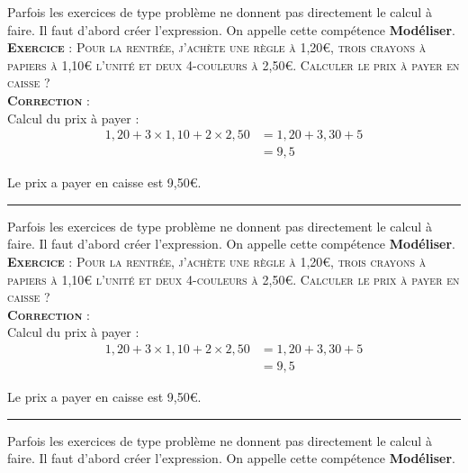 \documentclass[11pt]{article}
\newcommand{\horrule}[1]{\rule{\linewidth}{#1}} %
\begin{document}
Parfois les exercices de type problème ne donnent pas directement le calcul à faire. Il faut d'abord créer l'expression. On appelle cette compétence \textbf{Modéliser}.\\

\textsc{\textbf{Exercice} : Pour la rentrée, j'achète une règle à 1,20€, trois crayons à papiers à 1,10€ l'unité et deux 4-couleurs à 2,50€.} \newline
\textsc{Calculer le prix à payer en caisse ?}\\

\textsc{\textbf{Correction} :}\\

Calcul du prix à payer :
\begin{align*}
1,20 + 3 \times 1,10 + 2 \times 2,50 &= 1,20 + 3,30 + 5 \\
                                     &= 9,5
\end{align*}

Le prix a payer en caisse est 9,50€.

\vspace{0.5cm}\horrule{1px}\vspace{0.5cm}


Parfois les exercices de type problème ne donnent pas directement le calcul à faire. Il faut d'abord créer l'expression. On appelle cette compétence \textbf{Modéliser}.\\

\textsc{\textbf{Exercice} : Pour la rentrée, j'achète une règle à 1,20€, trois crayons à papiers à 1,10€ l'unité et deux 4-couleurs à 2,50€.} \newline
\textsc{Calculer le prix à payer en caisse ?}\\

\textsc{\textbf{Correction} :}\\

Calcul du prix à payer :
\begin{align*}
1,20 + 3 \times 1,10 + 2 \times 2,50 &= 1,20 + 3,30 + 5 \\
                                     &= 9,5
\end{align*}

Le prix a payer en caisse est 9,50€.

\vspace{0.5cm}\horrule{1px}\vspace{0.5cm}

Parfois les exercices de type problème ne donnent pas directement le calcul à faire. Il faut d'abord créer l'expression. On appelle cette compétence \textbf{Modéliser}.\\
\end{document}
